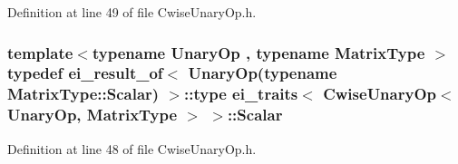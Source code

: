 Definition at line 49 of file Cwise\-Unary\-Op.\-h.

\hypertarget{structei__traits_3_01_cwise_unary_op_3_01_unary_op_00_01_matrix_type_01_4_01_4_a591ec31d9fc065c8a43f65d9ead1493f}{
\subsubsection[{Scalar}]{\setlength{\rightskip}{0pt plus 5cm}template$<$typename Unary\-Op , typename Matrix\-Type $>$ typedef {\bf ei\-\_\-result\-\_\-of}$<$ Unary\-Op(typename Matrix\-Type\-::\-Scalar) $>$\-::{\bf type} {\bf ei\-\_\-traits}$<$ {\bf Cwise\-Unary\-Op}$<$ Unary\-Op, Matrix\-Type $>$ $>$\-::{\bf Scalar}}}\label{structei__traits_3_01_cwise_unary_op_3_01_unary_op_00_01_matrix_type_01_4_01_4_a591ec31d9fc065c8a43f65d9ead1493f}


Definition at line 48 of file Cwise\-Unary\-Op.\-h.



